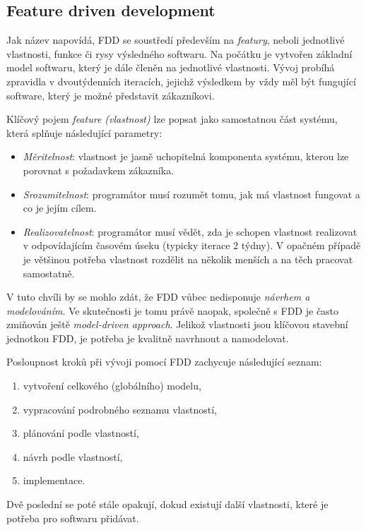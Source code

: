 
\subsection{Feature driven development} \label{methods:fdd}

Jak název napovídá, FDD se soustředí především na \emph{featury}, neboli jednotlivé vlastnosti, funkce či rysy výsledného softwaru. Na počátku je vytvořen základní model softwaru, který je dále členěn na jednotlivé vlastnosti. Vývoj probíhá zpravidla v dvoutýdenních iteracích, jejichž výsledkem by vždy měl být fungující software, který je možné představit zákazníkovi.

Klíčový pojem \emph{feature (vlastnost)}  lze popsat jako samostatnou část systému, která splňuje následující parametry:
\begin{itemize}
	\item \emph{Měritelnost}: vlastnost je jasně uchopitelná komponenta systému, kterou lze porovnat s požadavkem zákazníka.
	\item \emph{Srozumitelnost}: programátor musí rozumět tomu, jak má vlastnost fungovat a co je jejím cílem.
	\item \emph{Realizovatelnost}: programátor musí vědět, zda je schopen vlastnost realizovat v odpovídajícím časovém úseku (typicky iterace 2 týdny). V opačném případě je většinou potřeba vlastnost rozdělit na několik menších a na těch pracovat samostatně.
\end{itemize}

V tuto chvíli by se mohlo zdát, že FDD vůbec nedisponuje \emph{návrhem a modelováním}. Ve skutečnosti je tomu právě naopak, společně s FDD je často zmiňován ještě \emph{model-driven approach}. Jelikož vlastnosti jsou klíčovou stavební jednotkou FDD, je potřeba je kvalitně navrhnout a namodelovat.

Posloupnost kroků při vývoji pomocí FDD zachycuje následující seznam:
\begin{enumerate}
	\item vytvoření celkového (globálního) modelu,
	\item vypracování podrobného seznamu vlastností,
	\item plánování podle vlastností,
	\item návrh podle vlastností,
	\item implementace.
\end{enumerate}
Dvě poslední se poté stále opakují, dokud existují další vlastnosti, které je potřeba pro softwaru přidávat.

